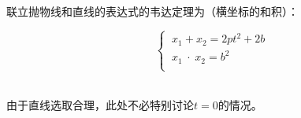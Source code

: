 \documentclass[UTF8]{ctexart}
\begin{document}
    联立抛物线和直线的表达式的韦达定理为（横坐标的和积）：\vspace{3pt}
    \begin{large}
        \begin{equation*}
            ~~~~~~\begin{cases}
                ~x_1+x_2=2pt^2+2b\\[1mm]
                ~x_1\hspace{3pt}\cdot\hspace{3pt}x_2=b^2\\[1mm]
            \end{cases}
        \end{equation*}
    \end{large}\\[1mm]
    由于直线选取合理，此处不必特别讨论$t=0$的情况。

\newpage
\end{document}

